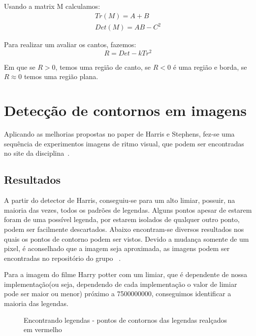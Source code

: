 \documentclass[10pt,a4paper]{article}
\begin{document}
\begin{enumerate}
Usando a matrix M calculamos:
\begin{eqnarray*}
Tr(M) = A + B\\
Det(M) = AB-C^2
\end{eqnarray*}

Para realizar um avaliar os cantos, fazemos:
\begin{equation}
R = Det - kTr^2
\end{equation}

Em que se $R>0$, temos uma região de canto, se $R<0$ é uma região e
borda, se $R \approx 0$ temos uma região plana.
\end{enumerate}

\section{Detecção de contornos em imagens}
Aplicando as melhorias propostas no paper de Harris e Stephens,
fez-se uma sequência de experimentos imagens de ritmo visual, que
podem ser encontradas no site
da disciplina~\cite{imagens}. 

\subsection{Resultados}
A partir do detector de Harris, conseguiu-se para um alto limiar,
possuir, na maioria das vezes, todos os padrões de legendas. Alguns
pontos apesar de estarem foram de uma possível legenda, por estarem
isolados de qualquer outro ponto, podem ser facilmente descartados. 
Abaixo encontram-se diversos resultados nos quais os pontos de
contorno podem ser vistos. Devido a mudança somente de um pixel, é
aconselhado que a imagem seja aproximada, as imagens podem ser
encontradas no repositório do grupo ~\cite{imgRel}.

Para a imagem do filme Harry potter com um limiar, que é dependente de
nossa implementação(ou seja, dependendo de cada implementação o valor
de limiar pode ser maior ou menor) próximo a 7500000000, conseguimos
identificar a maioria das legendas.
\begin{figure}[h!]
  \begin{center}
    \hspace{10mm}
    \caption{Encontrando legendas - pontos de contornos das legendas
      realçados em vermelho}
  \end{center}
\end{figure}
\end{document}
